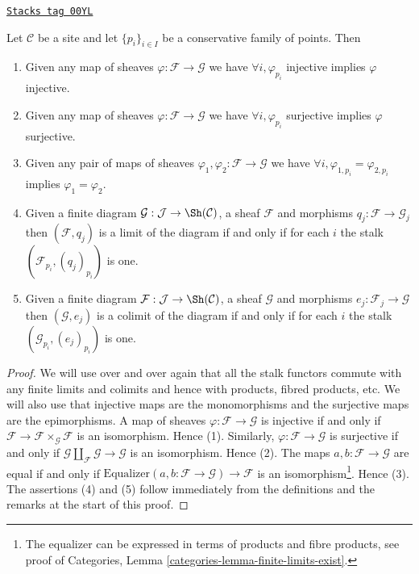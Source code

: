 \begin{lemma}
\label{sites-lemma-exactness-stalks}
\href{https://stacks.math.columbia.edu/tag/00YL}{\texttt{Stacks tag 00YL}}

Let $\mathcal{C}$ be a site and let $\{p_i\}_{i\in I}$ be a conservative
family of points. Then
\begin{enumerate}
\item Given any map of sheaves $\varphi : \mathcal{F} \to \mathcal{G}$
we have $\forall i, \varphi_{p_i}$ injective implies $\varphi$ injective.
\item Given any map of sheaves $\varphi : \mathcal{F} \to \mathcal{G}$
we have $\forall i, \varphi_{p_i}$ surjective implies $\varphi$ surjective.
\item Given any pair of maps of sheaves
$\varphi_1, \varphi_2 : \mathcal{F} \to \mathcal{G}$
we have $\forall i, \varphi_{1, p_i} = \varphi_{2, p_i}$
implies $\varphi_1 = \varphi_2$.
\item Given a finite diagram $\mathcal{G} : \mathcal{J}
\to \Sh(\mathcal{C})$, a sheaf $\mathcal{F}$ and morphisms
$q_j : \mathcal{F} \to \mathcal{G}_j$ then $(\mathcal{F}, q_j)$
is a limit of the diagram if and only if for each $i$ the stalk
$(\mathcal{F}_{p_i}, (q_j)_{p_i})$ is one.
\item Given a finite diagram $\mathcal{F} : \mathcal{J}
\to \Sh(\mathcal{C})$, a sheaf $\mathcal{G}$ and morphisms
$e_j : \mathcal{F}_j \to \mathcal{G}$ then $(\mathcal{G}, e_j)$
is a colimit of the diagram if and only if for each $i$ the stalk
$(\mathcal{G}_{p_i}, (e_j)_{p_i})$ is one.
\end{enumerate}
\end{lemma}

\begin{proof}
We will use over and over again that all the stalk functors commute
with any finite limits and colimits and hence with products, fibred
products, etc. We will also use that injective maps are the monomorphisms
and the surjective maps are the epimorphisms.
A map of sheaves $\varphi : \mathcal{F} \to \mathcal{G}$
is injective if and only if
$\mathcal{F} \to \mathcal{F} \times_\mathcal{G} \mathcal{F}$
is an isomorphism. Hence (1).
Similarly, $\varphi : \mathcal{F} \to \mathcal{G}$
is surjective if and only if
$\mathcal{G} \amalg_\mathcal{F} \mathcal{G} \to \mathcal{G}$
is an isomorphism. Hence (2).
The maps $a, b : \mathcal{F} \to \mathcal{G}$
are equal if and only if
$\text{Equalizer}(a, b : \mathcal{F} \to \mathcal{G}) \to \mathcal{F}$
is an isomorphism\footnote{The equalizer can be expressed
in terms of products and fibre products, see proof of
Categories, Lemma \ref{categories-lemma-finite-limits-exist}.}. Hence (3).
The assertions (4) and (5) follow immediately from the definitions
and the remarks at the start of this proof.
\end{proof}

